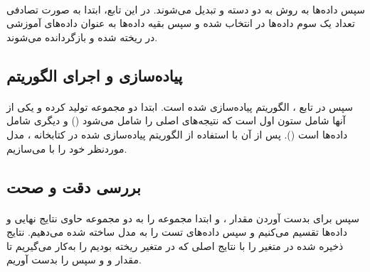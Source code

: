 \documentclass[a4paper,12pt]{article}
\begin{document}
\paragraph{}
سپس داده‌ها به روش  به دو دسته  و  تبدیل می‌شوند. در این تابع، ابتدا به صورت تصادفی تعداد یک سوم داده‌ها در  انتخاب شده و سپس بقیه داده‌ها به عنوان داده‌های آموزشی در  ریخته شده و بازگردانده می‌شوند.
\begin{flushleft}
\end{flushleft}

\subsection{پیاده‌سازی و اجرای الگوریتم}
\paragraph{}
سپس در تابع ، الگوریتم  پیاده‌سازی شده است. ابتدا دو مجموعه تولید کرده و یکی از آنها شامل ستون اول است که نتیجه‌های اصلی را شامل می‌شود () و دیگری شامل داده‌ها است (). پس از آن با استفاده از الگوریتم  پیاده‌سازی شده در کتابخانه ، مدل موردنظر خود را با  می‌سازیم.
	
\subsection{بررسی دقت و صحت}
\paragraph{}
سپس برای بدست آوردن مقدار ،  و  ابتدا مجموعه  را به دو مجموعه حاوی نتایج نهایی و داده‌ها تقسیم می‌کنیم و سپس داده‌های تست را به مدل ساخته شده می‌دهیم. نتایج ذخیره شده در متغیر  را با نتایج اصلی که در متغیر  ریخته بودیم را به‌کار می‌گیریم تا مقدار  و  و سپس  را بدست آوریم.
\begin{flushleft}
\end{flushleft}
	
\end{document}
